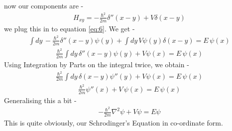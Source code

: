 now our components are - 
    \begin{align}
        \begin{equation} \label{eq:7}
            H_{xy} = -\frac{\hbar^2}{2m}\delta''(x-y) + V\delta(x-y)
        \end{equation}
    \end{align}
we plug this in to equation \ref{eq:6}. We get - 
    \begin{align}
        \begin{equation} \label{eq:7}
            \int dy \, -\frac{\hbar^2}{2m}\delta''(x-y) \psi(y) + \int dy \, V\psi(y)\delta(x-y) = E \, \psi(x)
        \end{equation}
    \end{align}
    \begin{align}
        \begin{equation} \label{eq:8}
            \frac{\hbar^2}{2m} \int dy \, \delta''(x-y) \psi(y) + V \psi(x) = E\,  \psi(x)        
        \end{equation}
    \end{align}
Using Integration by Parts on the integral twice, we obtain - 
    \begin{align}
        \begin{equation} \label{eq:9}
            \frac{\hbar^2}{2m} \int dy \, \delta(x-y) \psi''(y) + V \psi(x) = E\,  \psi(x)        
        \end{equation}
    \end{align}
    \begin{align}
        \begin{equation} \label{eq:10}
            \frac{\hbar^2}{2m} \psi''(x) + V\, \psi(x) = E\,  \psi(x)        
        \end{equation}
    \end{align}
Generalising this a bit - 
    \begin{align}
        \begin{equation} \label{eq:11}
            - \frac{\hbar^2}{2m} \nabla^2 \psi + V \psi = E \psi        
        \end{equation}
    \end{align}
This is quite obviously, our Schrodinger's Equation in co-ordinate form.
